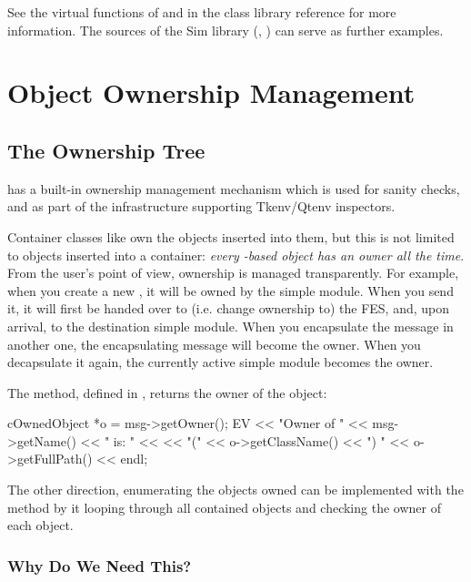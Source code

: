 See the virtual functions of  and 
in the class library reference for more information. The sources of the
Sim library (, ) can serve as further examples.



\section{Object Ownership Management}
\label{sec:sim-lib:ownership-management}

\subsection{The Ownership Tree}
\label{sec:sim-lib:ownership-tree}

{\opp} has a built-in ownership management mechanism which
is used for sanity checks, and as part of the infrastructure
supporting Tkenv/Qtenv inspectors.

Container classes like  own the objects inserted
into them, but this is not limited to objects inserted into a container:
\textit{every -based object has an owner all the time}.
From the user's point of view, ownership is managed transparently.
For example, when you create a new ,
it will be owned by the simple module. When you send it, it will
first be handed over to (i.e. change ownership to) the FES, and,
upon arrival, to the destination simple module. When you encapsulate
the message in another one, the encapsulating message will become
the owner. When you decapsulate it again, the currently active
simple module becomes the owner.

The  method, defined in , returns the
owner of the object:

\begin{cpp}
cOwnedObject *o = msg->getOwner();
EV << "Owner of " << msg->getName() << " is: " <<
   << "(" << o->getClassName() << ") " << o->getFullPath() << endl;
\end{cpp}

The other direction, enumerating the objects owned can be implemented with
the  method by it looping through all
contained objects and checking the owner of each object.

\subsubsection{Why Do We Need This?}
\label{sec:sim-lib:why-we-need-ownership}

